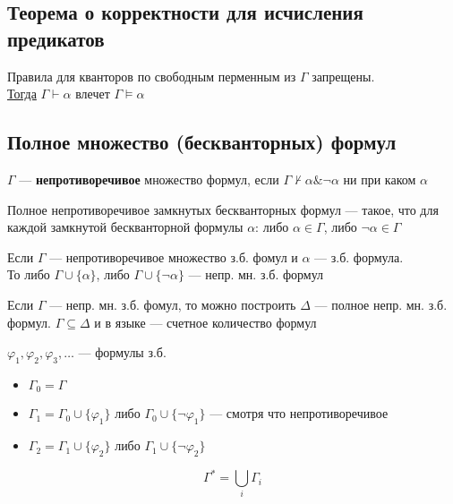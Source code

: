 \documentclass[english]{article}
\begin{document}
\subsection{Теорема о корректности для исчисления предикатов}
\label{sec:org7e08a51}
\begin{definition}
	Правила для кванторов по свободным перменным из \(\Gamma\) запрещены. \\
	\uline{Тогда} \(\Gamma \vdash \alpha\) влечет \(\Gamma \vDash \alpha\)
	\label{org8bf610f}
\end{definition}
\subsection{Полное множество (бескванторных) формул}
\label{sec:org641e70f}
\begin{definition}
	\(\Gamma\) --- \textbf{непротиворечивое} множество формул, если \(\Gamma \not\vdash \alpha \& \neg \alpha\) ни при каком \(\alpha\)
	\label{org3740c2c}
\end{definition}
\begin{definition}
	Полное непротиворечивое замкнутых бескванторных формул --- такое, что для каждой замкнутой бескванторной формулы \(\alpha\): либо \(\alpha \in \Gamma\), либо \(\neg \alpha \in \Gamma\)
	\label{org2677d0c}
\end{definition}
\begin{theorem}
	Если \(\Gamma\) --- непротиворечивое множество з.б. фомул и \(\alpha\) --- з.б.  формула. \\
	То либо \(\Gamma \cup \{\alpha\}\), либо \(\Gamma \cup \{\neg \alpha\}\) --- непр. мн. з.б. формул
	\label{org9fdb16c}
\end{theorem}
\begin{theorem}
	Если \(\Gamma\) --- непр. мн. з.б. фомул, то можно построить \(\Delta\) --- полное непр. мн. з.б. формул. \(\Gamma \subseteq \Delta\) и в языке --- счетное количество формул
	\label{org572fd1d}
\end{theorem}
\begin{definition}
	\(\varphi_1, \varphi_2, \varphi_3, \dots\) --- формулы з.б. \\
	\begin{itemize}
		\item \(\Gamma_0 = \Gamma\)
		\item \(\Gamma_1 = \Gamma_0 \cup \{\varphi_1\}\) либо \(\Gamma_0 \cup \{\neg \varphi_1\}\) --- смотря что непротиворечивое
		\item \(\Gamma_2 = \Gamma_1 \cup \{\varphi_2\}\) либо \(\Gamma_1 \cup \{\neg \varphi_2\}\)
	\end{itemize}
	\[ \Gamma^* = \bigcup_i \Gamma_i \]
	\label{org7e5c24c}
\end{definition}
\end{document}
